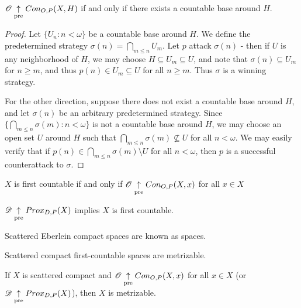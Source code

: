 \newpage

\begin{theorem}
  $\mathscr{O} \underset{\text{pre}}{\uparrow} Con_{O,P}(X,H)$ if and only if there exists a countable base 
  around $H$.
\end{theorem}

\begin{proof}
  Let $\{U_n:n<\omega\}$ be a countable base around $H$. We define the 
  predetermined strategy $\sigma(n)=\bigcap_{m\leq n}U_m$. Let $p$ attack 
  $\sigma(n)$ - then if $U$ is any neighborhood of $H$, we may choose 
  $H\subseteq U_m\subseteq U$, and note that $\sigma(n)\subseteq U_m$ for 
  $n\geq m$, and thus $p(n)\in U_m\subseteq U$ for all $n\geq m$. Thus 
  $\sigma$ is a winning strategy.

  For the other direction, suppose there does not exist a countable base 
  around $H$, and let $\sigma(n)$ be an arbitrary predetermined strategy. 
  Since $\{\bigcap_{m\leq n}\sigma(m):n<\omega\}$ is not a countable base 
  around $H$, we may choose an open set $U$ around $H$ such that 
  $\bigcap_{m\leq n}\sigma(m)\not\subseteq U$ for all $n<\omega$. We may 
  easily verify that if $p(n)\in\bigcap_{m\leq n}\sigma(m)\setminus U$ for 
  all $n<\omega$, then $p$ is a successful counterattack to $\sigma$.
\end{proof}

\begin{corollary}
  $X$ is first countable if and only if $\mathscr{O} \underset{\text{pre}}{\uparrow} Con_{O,P}(X,x)$ for 
  all $x\in X$
\end{corollary}

\begin{corollary}
  $\mathscr{D} \underset{\text{pre}}{\uparrow} Prox_{D,P}(X)$ implies $X$ is first countable.
\end{corollary}

\begin{definition}
  Scattered Eberlein compact spaces are known as  spaces.
\end{definition}

\begin{theorem}[folklore]
  Scattered compact first-countable spaces are metrizable.
\end{theorem}

\begin{corollary}
  If $X$ is scattered compact and $\mathscr{O} \underset{\text{pre}}{\uparrow}Con_{O,P}(X,x)$ for all
  $x\in X$ (or $\mathscr{D} \underset{\text{pre}}{\uparrow}Prox_{D,P}(X)$), then $X$ is metrizable.
\end{corollary}


